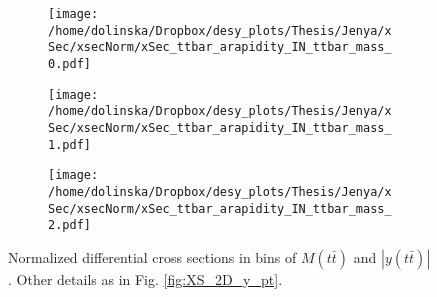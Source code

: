 \begin{figure}[H]
\centering
\begin{subfigure}
  \centering
  \texttt{[image: /home/dolinska/Dropbox/desy\_plots/Thesis/Jenya/xSec/xsecNorm/xSec\_ttbar\_arapidity\_IN\_ttbar\_mass\_0.pdf]}
\end{subfigure}
\begin{subfigure}
  \centering
  \texttt{[image: /home/dolinska/Dropbox/desy\_plots/Thesis/Jenya/xSec/xsecNorm/xSec\_ttbar\_arapidity\_IN\_ttbar\_mass\_1.pdf]}
\end{subfigure}
\begin{subfigure}
  \centering
  \texttt{[image: /home/dolinska/Dropbox/desy\_plots/Thesis/Jenya/xSec/xsecNorm/xSec\_ttbar\_arapidity\_IN\_ttbar\_mass\_2.pdf]}
\end{subfigure}
\caption{Normalized differential cross sections in bins of $M(t\bar{t})$ and $|y(t\bar{t})|$. Other details as in Fig. \ref{fig:XS_2D_y_pt}.}
\label{fig:XS_2D_ytt_Mtt}
\end{figure}

